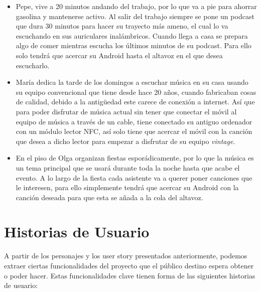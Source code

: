 \begin{itemize}
    \item Pepe, vive a 20 minutos andando del trabajo, por lo que va a
    pie para ahorrar gasolina y mantenerse activo. Al salir del trabajo siempre
    se pone un podcast que dura 30 minutos para hacer su trayecto más ameno, el
    cual lo va escuchando en sus auriculares inalámbricos. Cuando llega a casa
    se prepara algo de comer mientras escucha los últimos minutos de su podcast.
    Para ello solo tendrá que acercar su Android hasta el altavoz en el que
    desea escucharlo.
    \item María dedica la tarde de los domingos a escuchar música en su casa
    usando su equipo convencional que tiene desde hace 20 años, cuando
    fabricaban cosas de calidad, debido a la antigüedad este carece de conexión
    a internet. Así que para poder disfrutar de música actual sin tener que
    conectar el móvil al equipo de música a través de un cable, tiene conectado
    su antiguo ordenador con un módulo lector NFC, así solo tiene que acercar el
    móvil con la canción que desea a dicho lector para empezar a disfrutar de su
    equipo \emph{vintage}.
    \item En el piso de Olga organizan fiestas esporádicamente, por lo que la
    música es un tema principal que se usará durante toda la noche hasta que
    acabe el evento. A lo largo de la fiesta cada asistente va a querer poner
    canciones que le interesen, para ello simplemente tendrá que acercar su
    Android con la canción deseada para que esta se añada a la cola del altavoz.
\end{itemize}


\section{Historias de Usuario}
A partir de los personajes y los user story presentados anteriormente, podemos
extraer ciertas funcionalidades del proyecto que el público destino espera
obtener o poder hacer. Estas funcionalidades clave tienen forma de las
siguientes historias de usuario:

